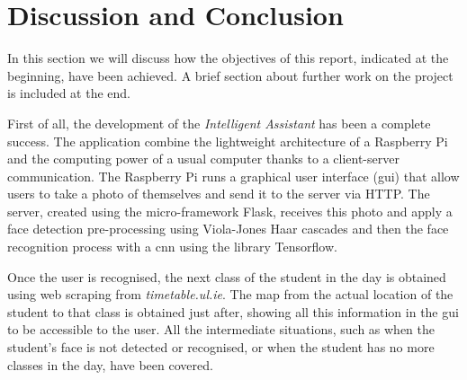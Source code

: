 \chapter{Discussion and Conclusion}
\label{ch:conclussions}
In this section we will discuss how the objectives of this report, indicated at the beginning, have been achieved. A brief section about further work on the project is included at the end.

First of all, the development of the \textit{Intelligent Assistant} has been a complete success. The application combine the lightweight architecture of a Raspberry Pi and the computing power of a usual computer thanks to a client-server communication. The Raspberry Pi runs a graphical user interface (\gls{gui}) that allow users to take a photo of themselves and send it to the server via HTTP. The server, created using the micro-framework Flask, receives this photo and apply a face detection pre-processing using Viola-Jones Haar cascades and then the face recognition process with a \gls{cnn} using the library Tensorflow.

Once the user is recognised, the next class of the student in the day is obtained using web scraping from \textit{timetable.ul.ie}. The map from the actual location of the student to that class is obtained just after, showing all this information in the \gls{gui} to be accessible to the user. All the intermediate situations, such as when the student's face is not detected or recognised, or when the student has no more classes in the day, have been covered. 
